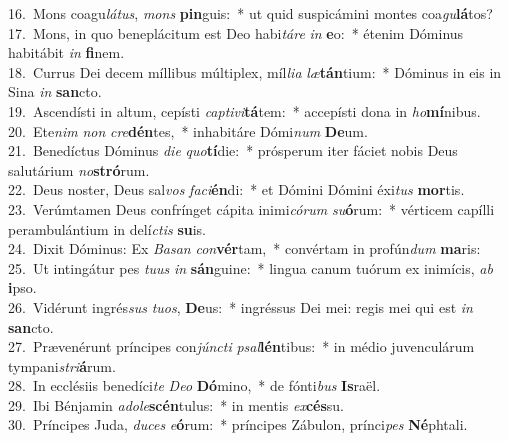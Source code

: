 {16.~}Mons coagu\textit{lá}\textit{tus}, \textit{mons} \textbf{pin}guis:~* ut quid suspicámini montes coa\textit{gu}\textbf{lá}tos?\\
{17.~}Mons, in quo beneplácitum est Deo habi\textit{tá}\textit{re} \textit{in} \textbf{e}o:~* étenim Dóminus habitábit \textit{in} \textbf{fi}nem.\\
{18.~}Currus Dei decem míllibus múltiplex, míl\textit{li}\textit{a} \textit{læ}\textbf{tán}tium:~* Dóminus in eis in Sina \textit{in} \textbf{san}cto.\\
{19.~}Ascendísti in altum, cepísti \textit{cap}\textit{ti}\textit{vi}\textbf{tá}tem:~* accepísti dona in \textit{ho}\textbf{mí}nibus.\\
{20.~}Ete\textit{nim} \textit{non} \textit{cre}\textbf{dén}tes,~* inhabitáre Dómi\textit{num} \textbf{De}um.\\
{21.~}Benedíctus Dóminus \textit{di}\textit{e} \textit{quo}\textbf{tí}die:~* prósperum iter fáciet nobis Deus salutárium \textit{no}\textbf{stró}rum.\\
{22.~}Deus noster, Deus sal\textit{vos} \textit{fa}\textit{ci}\textbf{én}di:~* et Dómini Dómini éxi\textit{tus} \textbf{mor}tis.\\
{23.~}Verúmtamen Deus confrínget cápita inimi\textit{có}\textit{rum} \textit{su}\textbf{ó}rum:~* vérticem capílli perambulántium in delí\textit{ctis} \textbf{su}is.\\
{24.~}Dixit Dóminus: Ex \textit{Ba}\textit{san} \textit{con}\textbf{vér}tam,~* convértam in profún\textit{dum} \textbf{ma}ris:\\
{25.~}Ut intingátur pes \textit{tu}\textit{us} \textit{in} \textbf{sán}guine:~* lingua canum tuórum ex inimícis, \textit{ab} \textbf{i}pso.\\
{26.~}Vidérunt ingrés\textit{sus} \textit{tu}\textit{os}, \textbf{De}us:~* ingréssus Dei mei: regis mei qui est \textit{in} \textbf{san}cto.\\
{27.~}Prævenérunt príncipes con\textit{jún}\textit{cti} \textit{psal}\textbf{lén}tibus:~* in médio juvenculárum tympani\textit{stri}\textbf{á}rum.\\
{28.~}In ecclésiis benedíci\textit{te} \textit{De}\textit{o} \textbf{Dó}mino,~* de fónti\textit{bus} \textbf{Is}raël.\\
{29.~}Ibi Bénjamin \textit{a}\textit{do}\textit{le}\textbf{scén}tulus:~* in mentis \textit{ex}\textbf{cés}su.\\
{30.~}Príncipes Juda, \textit{du}\textit{ces} \textit{e}\textbf{ó}rum:~* príncipes Zábulon, prínci\textit{pes} \textbf{Né}phtali.\\
